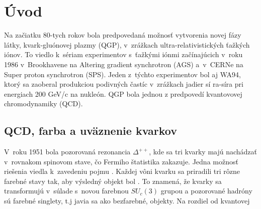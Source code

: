 \chapter{Úvod}
Na začiatku 80-tych rokov bola predpovedaná možnosť
vytvorenia novej fázy látky, kvark-gluónovej plazmy (QGP), v~zrážkach
ultra-relativistických ťažkých iónov. To viedlo k~sériam
experimentov s~ťažkými iónmi začínajúcich v~roku 1986
v~Brookhavene na Altering gradient synchrotron (AGS) a~v~CERNe na Super
proton synchrotron (SPS). Jeden z~týchto experimentov bol aj WA94, ktorý
sa zaoberal produkciou podivných častíc v~zrážkach jadier sí
ra-síra pri energiach 200 GeV/c na nukleón. QGP bola jednou z
predpovedí kvantovovej chromodynamiky (QCD).

\section{QCD, farba a uväznenie kvarkov}
V~roku 1951 bola pozorovaná rezonancia $\Delta^{++}$, kde sa tri kvarky
majú nachádzať v~rovnakom spinovom stave, čo Fermiho štatistika
zakazuje. Jedna možnosť riešenia viedla
k~zavedeniu pojmu . Každej vôni kvarku sa priradili tri
rôzne farebné stavy tak, aby výsledný objekt bol .
To znamená, že kvarky sa transformujú v~súlade s~novou farebnou
$SU_c(3)$ grupou a pozorované hadróny sú farebné singlety, t.j javia
sa ako bezfarebné,  objekty. Na rozdiel od kvantovej
